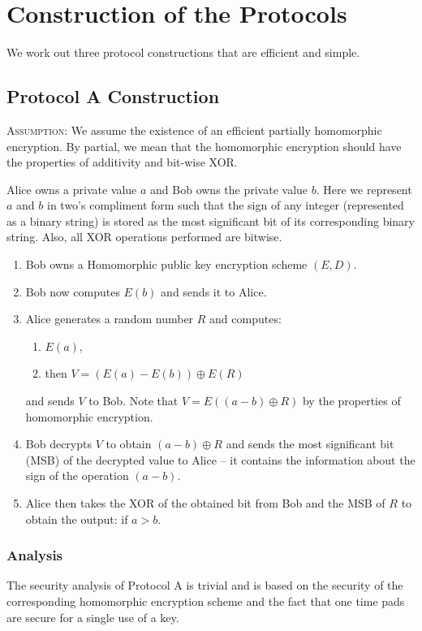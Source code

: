 \documentclass[11pt, letterpaper, romanappendices, onecolumn]{article}
\theoremstyle{plain}\newtheorem{thm}{Theorem}[section]
\theoremstyle{definition}
\theoremstyle{remark}
\begin{document}
\section{Construction of the Protocols}\label{sec3}
We work out three protocol constructions that are efficient and simple.

\subsection{Protocol \textsf{A} Construction}
\textsc{Assumption:} We assume the existence of an efficient partially homomorphic encryption. By partial, we mean that the homomorphic encryption should have the properties of additivity and bit-wise XOR.

\par Alice owns a private value $a$ and Bob owns the private value $b$. Here we represent $a$ and $b$ in two's compliment form such that the sign of any integer (represented as a binary string) is stored as the most significant bit of its corresponding binary string. Also, all XOR operations performed are bitwise.

\begin{enumerate}
	\item Bob owns a Homomorphic public key encryption scheme $(E, D)$.
	\item Bob now computes $E(b)$ and sends it to Alice.
	\item Alice generates a random number $R$ and computes:
	\begin{enumerate}
		\item $E(a)$,
		\item then $V = (E(a)-E(b)) \oplus E(R)$
	\end{enumerate}
	and sends $V$ to Bob. Note that $V = E((a-b)\oplus R)$ by the properties of homomorphic encryption.
	\item Bob decrypts $V$ to obtain $(a-b) \oplus R$ and sends the most significant bit (MSB) of the decrypted value to Alice -- it contains the information about the sign of the operation $(a - b)$.
	\item Alice then takes the XOR of the obtained bit from Bob and the MSB of $R$ to obtain the output: if $a > b$.
\end{enumerate}

\subsubsection{Analysis}
\par The security analysis of Protocol \textsf{A} is trivial and is based on the security of the corresponding homomorphic encryption scheme and the fact that one time pads are secure for a single use of a key.
\end{document}
